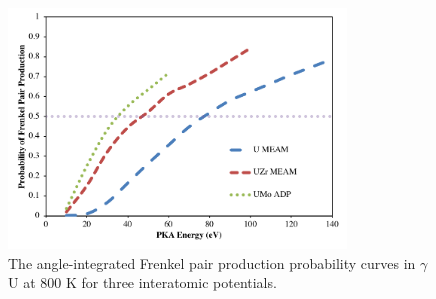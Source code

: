 \documentclass[review]{elsarticle}
\providecommand{\DIFdelbegin}{} %
\newcommand{\DIFscaledelfig}{0.5}
\newlength{\DIFdelgraphicswidth} %
\newlength{\DIFdelgraphicsheight} %
\newcommand{\DIFdelincludegraphics}[2][]{%
\sbox{\DIFdelgraphicsbox}{\DIFOincludegraphics[#1]{#2}}%
\settoboxwidth{\DIFdelgraphicswidth}{\DIFdelgraphicsbox} %
\settoboxtotalheight{\DIFdelgraphicsheight}{\DIFdelgraphicsbox} %
\scalebox{\DIFscaledelfig}{%
\parbox[b]{\DIFdelgraphicswidth}{\usebox{\DIFdelgraphicsbox}\\[-\baselineskip] \rule{\DIFdelgraphicswidth}{0em}}\llap{\resizebox{\DIFdelgraphicswidth}{\DIFdelgraphicsheight}{%
\setlength{\unitlength}{\DIFdelgraphicswidth}%
\begin{picture}(1,1)%
\thicklines\linethickness{2pt} %
{\color[rgb]{1,0,0}\put(0,0){\framebox(1,1){}}}%
{\color[rgb]{1,0,0}\put(0,0){\line( 1,1){1}}}%
{\color[rgb]{1,0,0}\put(0,1){\line(1,-1){1}}}%
\end{picture}%
}\hspace*{3pt}}} %
} %
\DeclareRobustCommand{\DIFdelbegin}{\DIFOdelbegin \let\includegraphics\DIFdelincludegraphics} %
\begin{document}
\begin{figure}[h]
 \centering
 \includegraphics[width=0.8\textwidth]{gam800.png} 
 \caption{The angle-integrated Frenkel pair production probability curves in $\gamma$U at 800 K for three interatomic potentials.}
 \label{fig:gam800}
\end{figure}
\DIFdelbegin %

\end{document}
